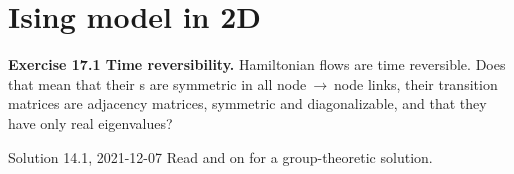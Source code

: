 
\chapter{Ising model in 2D}
\label{chap:Ising2D}

\begin{bartlett}{
{\bf Exercise 17.1 Time reversibility.}
Hamiltonian flows are time reversible. Does that mean that
their \markGraph s are symmetric in all node$~\to~$node links,
their transition matrices are adjacency matrices, symmetric and
diagonalizable, and that they have only real eigenvalues?

Solution 14.1, 2021-12-07 Read  and on for a
group-theoretic solution.
                }
\end{bartlett}

\bigskip

